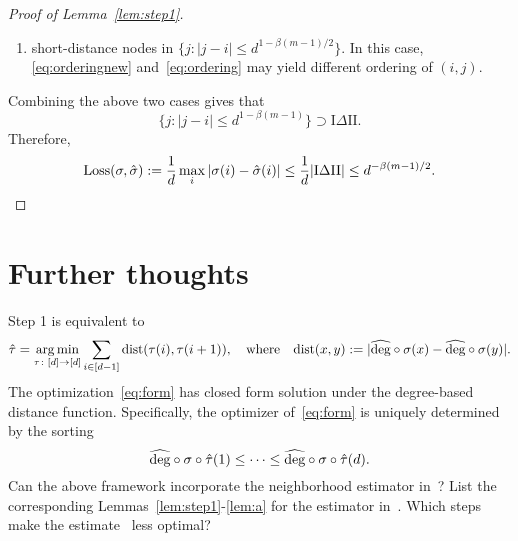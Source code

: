 \documentclass[10pt]{article}
\theoremstyle{definition}
\theoremstyle{definition}
\newcommand{\hdeg}{\widehat{\textup{deg}}}
\theoremstyle{definition}
\begin{document}
\begin{proof}[Proof of Lemma~\ref{lem:step1}]
\begin{enumerate}
Therefore, we conclude that none of long-distance nodes belong to I $\Delta$ II. 
\item short-distance nodes in $\{j\colon |j-i|\leq d^{1-\beta(m-1)/2}\}$. In this case, \eqref{eq:orderingnew} and~\eqref{eq:ordering} may yield different ordering of $(i,j)$. 
\end{enumerate}
Combining the above two cases gives that
\[
\{j\colon |j-i|\leq d^{1-\beta(m-1)}\} \supset \text{I}\Delta \text{II}. 
\]
Therefore, 
\[
\text{Loss}(\sigma, \hat\sigma):={1\over d}\max_{i}|\sigma(i)-  \hat \sigma(i)|\leq {1\over d}|\text{I}\Delta \text{II}|\leq d^{-\beta(m-1)/2}. 
\]
\end{proof}

\section{Further thoughts}
Step 1 is equivalent to 
\begin{equation}\label{eq:form}
\hat \tau = \argmin_{\tau \colon[d]\to[d]}\sum_{i\in[d-1]}\text{dist}(\tau (i),\tau(i+1)), \quad \text{where}\quad \text{dist}(x,y):=|\hdeg \circ \sigma (x)-\hdeg\circ \sigma (y)|.
\end{equation}
The optimization~\eqref{eq:form} has closed form solution under the degree-based distance function. Specifically, the optimizer of~\eqref{eq:form} is uniquely determined by the sorting
\[
\hdeg \circ \sigma \circ \hat \tau(1)\leq \cdots \leq \hdeg\circ  \sigma\circ\hat \tau(d). 
\]
Can the above framework incorporate the neighborhood estimator in~\cite{zhang2015estimating,airoldi2013stochastic}? List the corresponding Lemmas~\ref{lem:step1}-\ref{lem:a} for the estimator in~\cite{zhang2015estimating}. Which steps make the estimate~\cite{zhang2015estimating} less optimal?



\end{document}
